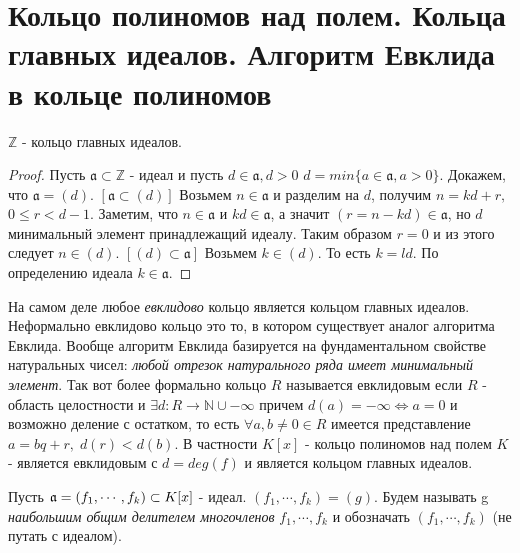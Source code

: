 \section{Кольцо полиномов над полем. Кольца главных идеалов. Алгоритм Евклида в кольце полиномов}

\begin{thm}
  $  \mathbb{Z} $ - кольцо главных идеалов. 
\end{thm}

\begin{proof}
  Пусть $ \mathfrak{a} \subset \mathbb{Z} $ - идеал и пусть $ d \in \mathfrak{a}, d > 0 $ \newline 
  $ d = min\{ a \in \mathfrak{a}, a > 0 \} $. Докажем, что $ \mathfrak{a} = (d) $. \newline
  $ [\mathfrak{a} \subset (d)] $ \newline
  Возьмем $ n \in \mathfrak{a} $ и разделим на $ d $, получим \newline $ n = kd + r, \; $ $ 0 \le r < d - 1 $. \newline
  Заметим, что $ n \in \mathfrak{a} $ и $ kd \in \mathfrak{a} $, а значит $ (r = n - kd) \in \mathfrak{a} $, но $ d $
  минимальный элемент принадлежащий идеалу. Таким образом $ r = 0 $ и из этого следует $ n \in (d) $. \newline
  $ [(d) \subset \mathfrak{a}] $ \newline
  Возьмем $ k \in (d) $. То есть $ k = ld $. По определению идеала $ k \in \mathfrak{a} $.
\end{proof}

На самом деле любое \emph{евклидово} кольцо является кольцом главных идеалов. Неформально евклидово 
кольцо это то, в котором существует аналог алгоритма Евклида. Вообще алгоритм Евклида базируется на
фундаментальном свойстве натуральных чисел: \emph{любой отрезок натурального ряда имеет минимальный элемент}.
Так вот более формально кольцо $ R $ называется евклидовым если $ R $ - область целостности и 
$ \exists d : R \rightarrow \mathbb{N} \cup -\infty $ причем $ d(a) = -\infty \Leftrightarrow a = 0 $ и 
возможно деление с остатком, то есть $ \forall a, b \ne 0 \in R $ имеется представление $ a = bq + r, \;
d(r) < d(b) $. В частности $ K[x] $ - кольцо полиномов над полем
$ K $ - является евклидовым с $ d = deg(f) $ и является кольцом главных идеалов.

\begin{defn}
  Пусть $ \mathfrak{a} = (f_{1}, \cdots, f_{k}) \subset K[x] $ - идеал. \newline
  $ (f_{1}, \cdots, f_{k}) = (g) $. Будем называть g \emph{наибольшим общим делителем многочленов} 
  $ f_{1}, \cdots, f_{k} $ и обозначать $ (f_{1}, \cdots, f_{k}) $ (не путать с идеалом).
\end{defn}

